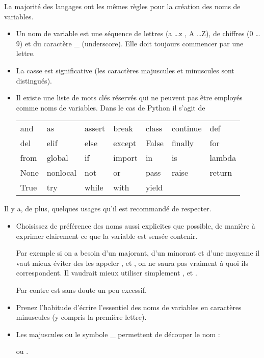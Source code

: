 La majorité des langages ont les mêmes règles pour la création des noms de variables. 
\begin{itemize}
\item Un nom de variable est une séquence de lettres (a \dots z , A \dots Z), de chiffres (0 \dots 9) et du caractère \_ (underscore). Elle doit toujours commencer par une lettre.
\item La casse est significative (les caractères majuscules et minuscules sont distingués).

\item Il existe une liste de mots clés réservés qui ne peuvent pas être employés comme noms de variables.
Dans le cas de Python il s'agit de 

\begin{tabular}{p{16mm}p{16mm}p{16mm}p{16mm}p{16mm}p{16mm}p{16mm}}
and & as & assert & break &  class &  continue & def\\
del & elif & else & except & False & finally & for\\
from & global & if & import & in & is & lambda\\
None & nonlocal & not & or & pass & raise & return\\
True & try & while & with & yield\\
\end{tabular}

\end{itemize}
Il y a, de plus, quelques usages qu'il est recommandé de respecter.
\begin{itemize}
\item Choisissez de préférence des noms aussi explicites que possible, de manière à exprimer clairement ce que la variable est sensée contenir. 

Par exemple si on a besoin d'un majorant, d'un minorant et d'une moyenne il vaut mieux éviter des les appeler ,  et , on ne saura pas vraiment à quoi ils correspondent.
Il vaudrait mieux utiliser simplement ,  et .

Par contre  est sans doute un peu excessif.

\item Prenez l'habitude d'écrire l'essentiel des noms de variables en caractères minuscules (y compris la première lettre). 

\item Les majuscules ou le symbole \_ permettent de découper le nom : 

 ou .

\end{itemize}
